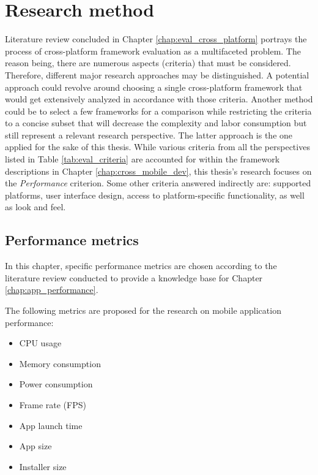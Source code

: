 
\chapter{Research method}

Literature review concluded in Chapter \ref{chap:eval_cross_platform} portrays the process of cross-platform framework evaluation as a multifaceted problem. The reason being, there are numerous aspects (criteria) that must be considered. Therefore, different major research approaches may be distinguished. A potential approach could revolve around choosing a single cross-platform framework that would get extensively analyzed in accordance with those criteria. Another method could be to select a few frameworks for a comparison while restricting the criteria to a concise subset that will decrease the complexity and labor consumption but still represent a relevant research perspective. The latter approach is the one applied for the sake of this thesis. While various criteria from all the perspectives listed in Table \ref{tab:eval_criteria} are accounted for within the framework descriptions in Chapter \ref{chap:cross_mobile_dev}, this thesis's research focuses on the \emph{Performance} criterion. Some other criteria answered indirectly are: supported platforms, user interface design, access to platform-specific functionality, as well as look and feel.

\section{Performance metrics}

In this chapter, specific performance metrics are chosen according to the literature review conducted to provide a knowledge base for Chapter \ref{chap:app_performance}.

\bigskip

The following metrics are proposed for the research on mobile application performance:

\begin{itemize}
    \item CPU usage
    \item Memory consumption
    \item Power consumption
    \item Frame rate (FPS)
    \item App launch time
    \item App size
    \item Installer size
\end{itemize}

